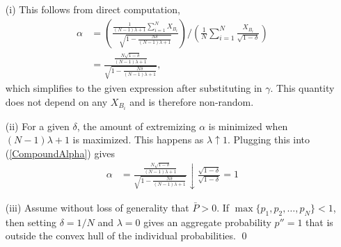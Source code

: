 \documentclass[11pt]{article}
\theoremstyle{definition}
\theoremstyle{definition}
\begin{document}
\begin{enumerate}
\item[(i)] This follows from direct computation,
\begin{align}
\alpha &= \left( \frac{\frac{1}{(N-1)\lambda +1} 
  \sum_{i=1}^N X_{B_i} }{\sqrt{1- \frac{N\delta}{(N-1)\lambda +1} }} \right) \Big/ \left( \frac{1}{N} \sum_{i=1}^N \frac{X_{B_i}}{\sqrt{1-\delta}} \right) \nonumber \\
&=    \frac{\frac{N\sqrt{1-\delta}}{(N-1)\lambda +1} 
   }{\sqrt{1- \frac{N\delta}{(N-1)\lambda +1} }}, \label{CompoundAlpha}
\end{align}
which simplifies to the given expression after substituting in $\gamma$. This quantity does not depend on any $X_{B_i}$ and is therefore non-random.

\item[(ii)] For a given $\delta$, the amount of extremizing $\alpha$ is minimized when $(N-1)\lambda +1$ is maximized. This happens as $\lambda \uparrow 1$. Plugging this into (\ref{CompoundAlpha}) gives
\begin{align*}
\alpha &= \frac{\frac{N\sqrt{1-\delta}}{(N-1)\lambda +1}}{\sqrt{1- \frac{N\delta}{(N-1)\lambda +1} }}  \downarrow \frac{\sqrt{1-\delta}}{\sqrt{1-\delta }} = 1
\end{align*}
\item[(iii)] Assume without loss of generality that $\bar{P} > 0$. If $\max\{p_1, p_2, \dots, p_N \} < 1$, then  setting $\delta = 1/N$ and $\lambda = 0$ gives an aggregate probability $p'' = 1$ that is outside the convex hull of the individual probabilities.
\qed
\end{enumerate}
\end{document}
